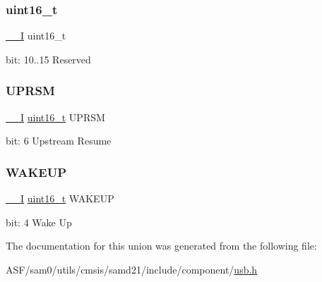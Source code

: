 \subsubsection{\texorpdfstring{uint16\_t}{uint16\_t}}
{\footnotesize\ttfamily \mbox{\hyperlink{core__cm0plus_8h_af63697ed9952cc71e1225efe205f6cd3}{\+\_\+\+\_\+I}} uint16\+\_\+t}

bit\+: 10..15 Reserved \mbox{\label{union_u_s_b___d_e_v_i_c_e___i_n_t_f_l_a_g___type_a967d41d70af5b8569d8b5ab91c56369e}} 
\subsubsection{\texorpdfstring{UPRSM}{UPRSM}}
{\footnotesize\ttfamily \mbox{\hyperlink{core__cm0plus_8h_af63697ed9952cc71e1225efe205f6cd3}{\+\_\+\+\_\+I}} \mbox{\hyperlink{union_u_s_b___d_e_v_i_c_e___i_n_t_f_l_a_g___type_a25e8fd3335b0c4872c6e2910bd01f0f6}{uint16\+\_\+t}} U\+P\+R\+SM}

bit\+: 6 Upstream Resume \mbox{\label{union_u_s_b___d_e_v_i_c_e___i_n_t_f_l_a_g___type_a84bb3fe0a50a407a76cf6111eee40622}} 
\subsubsection{\texorpdfstring{WAKEUP}{WAKEUP}}
{\footnotesize\ttfamily \mbox{\hyperlink{core__cm0plus_8h_af63697ed9952cc71e1225efe205f6cd3}{\+\_\+\+\_\+I}} \mbox{\hyperlink{union_u_s_b___d_e_v_i_c_e___i_n_t_f_l_a_g___type_a25e8fd3335b0c4872c6e2910bd01f0f6}{uint16\+\_\+t}} W\+A\+K\+E\+UP}

bit\+: 4 Wake Up 

The documentation for this union was generated from the following file\+:\begin{DoxyCompactItemize}
\item 
A\+S\+F/sam0/utils/cmsis/samd21/include/component/\mbox{\hyperlink{component_2usb_8h}{usb.\+h}}\end{DoxyCompactItemize}
